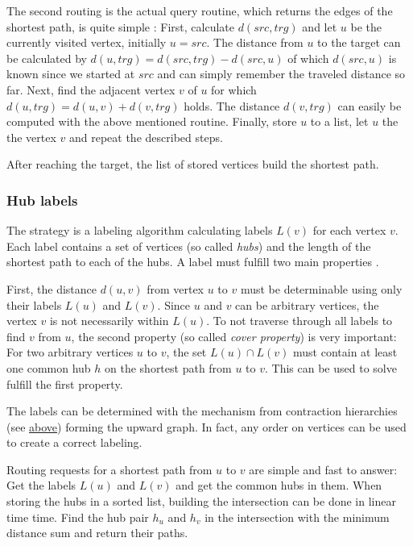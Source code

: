 			The second routing is the actual query routine, which returns the edges of the shortest path, is quite simple \cite[8]{bast-transit}:
			First, calculate $d(src, trg)$ and let $u$ be the currently visited vertex, initially $u = src$.
			The distance from $u$ to the target can be calculated by $d(u, trg) = d(src, trg) - d(src, u)$ of which $d(src, u)$ is known since we started at $src$ and can simply remember the traveled distance so far.
			Next, find the adjacent vertex $v$ of $u$ for which $d(u, trg) = d(u, v) + d(v, trg)$ holds.
			The distance $d(v, trg)$ can easily be computed with the above mentioned routine.
			Finally, store $u$ to a list, let $u$ the the vertex $v$ and repeat the described steps.
			
			After reaching the target, the list of stored vertices build the shortest path.
		
		\subsubsection{Hub labels}
		
			The  strategy is a labeling algorithm calculating labels $L(v)$ for each vertex $v$.
			Each label contains a set of vertices (so called \emph{hubs}) and the length of the shortest path to each of the hubs.
			A label must fulfill two main properties \cite[11]{bast-transportation-networks}.
			
			First, the distance $d(u, v)$ from vertex $u$ to $v$ must be determinable using only their labels $L(u)$ and $L(v)$.
			Since $u$ and $v$ can be arbitrary vertices, the vertex $v$ is not necessarily within $L(u)$.
			To not traverse through all labels to find $v$ from $u$, the second property (so called \emph{cover property}) is very important:
			For two arbitrary vertices $u$ to $v$, the set $L(u) \cap L(v)$ must contain at least one common hub $h$ on the shortest path from $u$ to $v$.
			This can be used to solve fulfill the first property.
			
			The labels can be determined with the mechanism from contraction hierarchies (see \hyperref[subsubsec:ch]{above}) forming the upward graph.
			In fact, any order on vertices can be used to create a correct labeling.

			Routing requests for a shortest path from $u$ to $v$ are simple and fast to answer:
			Get the labels $L(u)$ and $L(v)$ and get the common hubs in them.
			When storing the hubs in a sorted list, building the intersection can be done in linear time time.
			Find the hub pair $h_u$ and $h_v$ in the intersection with the minimum distance sum and return their paths.
			
